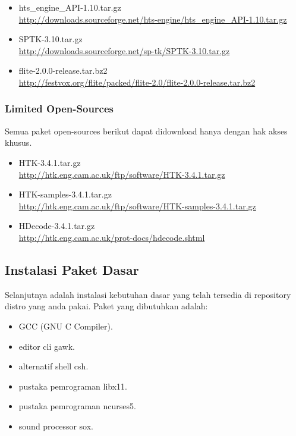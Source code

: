 \documentclass[12pt,]{article}
\begin{document}
\begin{itemize}
		\item hts\_engine\_API-1.10.tar.gz \\
		\url{http://downloads.sourceforge.net/hts-engine/hts_engine_API-1.10.tar.gz}

		\item SPTK-3.10.tar.gz \\
		\url{http://downloads.sourceforge.net/sp-tk/SPTK-3.10.tar.gz}

		\item flite-2.0.0-release.tar.bz2 \\
		\url{http://festvox.org/flite/packed/flite-2.0/flite-2.0.0-release.tar.bz2}
	\end{itemize}

	\subsubsection{Limited Open-Sources}

	Semua paket open-sources berikut dapat didownload hanya dengan hak akses khusus.

	\begin{itemize}
		\item HTK-3.4.1.tar.gz \\
		\url{http://htk.eng.cam.ac.uk/ftp/software/HTK-3.4.1.tar.gz}

		\item HTK-samples-3.4.1.tar.gz \\
		\url{http://htk.eng.cam.ac.uk/ftp/software/HTK-samples-3.4.1.tar.gz}

		\item HDecode-3.4.1.tar.gz \\
		\url{http://htk.eng.cam.ac.uk/prot-docs/hdecode.shtml}


	\end{itemize}

	\subsection{Instalasi Paket Dasar}

	Selanjutnya adalah instalasi kebutuhan dasar yang telah tersedia di repository distro yang anda pakai.
	Paket yang dibutuhkan adalah:

	\begin{itemize}
		\item GCC (GNU C Compiler).
		\item editor cli gawk.
		\item alternatif shell csh.
		\item pustaka pemrograman libx11.
		\item pustaka pemrograman ncurses5.
		\item sound processor sox.
	\end{itemize}
\end{document}

